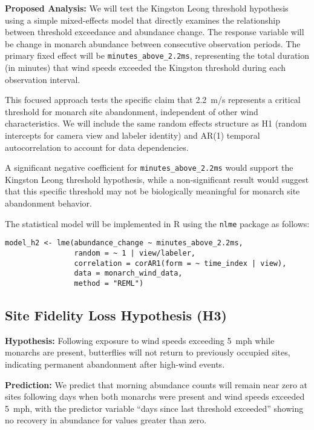 \textbf{Proposed Analysis:}
We will test the Kingston Leong threshold hypothesis using a simple mixed-effects model that directly examines the relationship between threshold exceedance and abundance change. The response variable will be change in monarch abundance between consecutive observation periods. The primary fixed effect will be \texttt{minutes\_above\_2.2ms}, representing the total duration (in minutes) that wind speeds exceeded the Kingston threshold during each observation interval.

This focused approach tests the specific claim that 2.2~m/s represents a critical threshold for monarch site abandonment, independent of other wind characteristics. We will include the same random effects structure as H1 (random intercepts for camera view and labeler identity) and AR(1) temporal autocorrelation to account for data dependencies.

A significant negative coefficient for \texttt{minutes\_above\_2.2ms} would support the Kingston Leong threshold hypothesis, while a non-significant result would suggest that this specific threshold may not be biologically meaningful for monarch site abandonment behavior.

The statistical model will be implemented in R using the \texttt{nlme} package as follows:

\begin{verbatim}
model_h2 <- lme(abundance_change ~ minutes_above_2.2ms,
                random = ~ 1 | view/labeler,
                correlation = corAR1(form = ~ time_index | view),
                data = monarch_wind_data,
                method = "REML")
\end{verbatim}

\subsection{Site Fidelity Loss Hypothesis (H3)}

\textbf{Hypothesis:} Following exposure to wind speeds exceeding 5~mph while monarchs are present, butterflies will not return to previously occupied sites, indicating permanent abandonment after high-wind events.

\textbf{Prediction:} We predict that morning abundance counts will remain near zero at sites following days when both monarchs were present and wind speeds exceeded 5~mph, with the predictor variable ``days since last threshold exceeded'' showing no recovery in abundance for values greater than zero.

